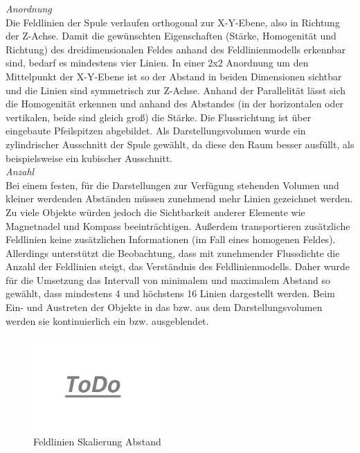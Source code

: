 \vspace{6px}
\textit{Anordnung}\\
Die Feldlinien der Spule verlaufen orthogonal zur X-Y-Ebene, also in Richtung der Z-Achse. Damit die gewünschten Eigenschaften (Stärke, Homogenität und Richtung) des dreidimensionalen Feldes anhand des Feldlinienmodells erkennbar sind, bedarf es mindestens vier Linien. In einer 2x2 Anordnung um den Mittelpunkt der X-Y-Ebene ist so der Abstand in beiden Dimensionen sichtbar und die Linien sind symmetrisch zur Z-Achse. Anhand der Parallelität lässt sich die Homogenität erkennen und anhand des Abstandes (in der horizontalen oder vertikalen, beide sind gleich groß) die Stärke. Die Flussrichtung ist über eingebaute Pfeilspitzen abgebildet. Als Darstellungsvolumen wurde ein zylindrischer Ausschnitt der Spule gewählt, da diese den Raum besser ausfüllt, als beispielsweise ein kubischer Ausschnitt.\\

\textit{Anzahl}\\
Bei einem festen, für die Darstellungen zur Verfügung stehenden Volumen und kleiner werdenden Abständen müssen zunehmend mehr Linien gezeichnet werden. Zu viele Objekte würden jedoch die Sichtbarkeit anderer Elemente wie Magnetnadel und Kompass beeinträchtigen. Außerdem transportieren zusätzliche Feldlinien keine zusätzlichen Informationen (im Fall eines homogenen Feldes). Allerdings unterstützt die Beobachtung, dass mit zunehmender Flussdichte die Anzahl der Feldlinien steigt, das Verständnis des Feldlinienmodells. Daher wurde für die Umsetzung das Intervall von minimalem und maximalem Abstand so gewählt, dass mindestens 4 und höchstens 16 Linien dargestellt werden. Beim Ein- und Austreten der Objekte in das bzw. aus dem Darstellungsvolumen werden sie kontinuierlich ein bzw. ausgeblendet.\\

\begin{figure}[H]
	\centering
	\includegraphics[width=0.45\textwidth]{images/todo.jpg}
	\caption{Feldlinien Skalierung Abstand}
	\label{img:mfield-lines-scaling}
\end{figure}

